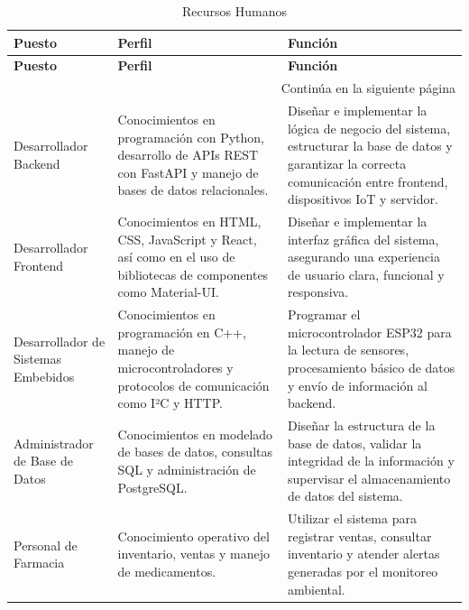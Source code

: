 \begin{longtable}{|p{3.5cm}|p{5cm}|p{5.5cm}|}

\caption{Recursos Humanos} \label{tab:recursos_humanos} \\

\hline
\rowcolor{gray!20}
\textbf{Puesto} & \textbf{Perfil} & \textbf{Función} \\
\hline
\endfirsthead

\hline
\rowcolor{gray!20}
\textbf{Puesto} & \textbf{Perfil} & \textbf{Función} \\
\hline
\endhead

\hline
\multicolumn{3}{|r|}{\small Continúa en la siguiente página} \\
\hline
\endfoot

\hline
\endlastfoot

Desarrollador Backend & Conocimientos en programación con Python, desarrollo de APIs REST con FastAPI y manejo de bases de datos relacionales. & Diseñar e implementar la lógica de negocio del sistema, estructurar la base de datos y garantizar la correcta comunicación entre frontend, dispositivos IoT y servidor. \\
\hline

Desarrollador Frontend & Conocimientos en HTML, CSS, JavaScript y React, así como en el uso de bibliotecas de componentes como Material-UI. & Diseñar e implementar la interfaz gráfica del sistema, asegurando una experiencia de usuario clara, funcional y responsiva. \\
\hline

Desarrollador de Sistemas Embebidos & Conocimientos en programación en C++, manejo de microcontroladores y protocolos de comunicación como I²C y HTTP. & Programar el microcontrolador ESP32 para la lectura de sensores, procesamiento básico de datos y envío de información al backend. \\
\hline

Administrador de Base de Datos & Conocimientos en modelado de bases de datos, consultas SQL y administración de PostgreSQL. & Diseñar la estructura de la base de datos, validar la integridad de la información y supervisar el almacenamiento de datos del sistema. \\
\hline

Personal de Farmacia & Conocimiento operativo del inventario, ventas y manejo de medicamentos. & Utilizar el sistema para registrar ventas, consultar inventario y atender alertas generadas por el monitoreo ambiental. \\
\hline

\end{longtable}






